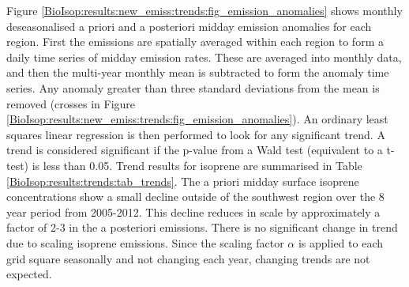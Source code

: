 \documentclass[acp, manuscript]{copernicus}
\begin{document}
      Figure \ref{BioIsop:results:new_emiss:trends:fig_emission_anomalies} shows monthly deseasonalised a priori and a posteriori midday emission anomalies for each region.
      First the emissions are spatially averaged within each region to form a daily time series of midday emission rates.
      These are averaged into monthly data, and then the multi-year monthly mean is subtracted to form the anomaly time series.
      Any anomaly greater than three standard deviations from the mean is removed (crosses in Figure \ref{BioIsop:results:new_emiss:trends:fig_emission_anomalies}).
      An ordinary least squares linear regression is then performed to look for any significant trend.
      A trend is considered significant if the p-value from a Wald test (equivalent to a t-test) is less than 0.05.
      Trend results for isoprene are summarised in Table \ref{BioIsop:results:trends:tab_trends}.
      The a priori midday surface isoprene concentrations show a small decline outside of the southwest region over the 8 year period from 2005-2012.
      This decline reduces in scale by approximately a factor of 2-3 in the a posteriori emissions.
      There is no significant change in trend due to scaling isoprene emissions.
      Since the scaling factor $\alpha$ is applied to each grid square seasonally and not changing each year, changing trends are not expected.
      
\end{document}
